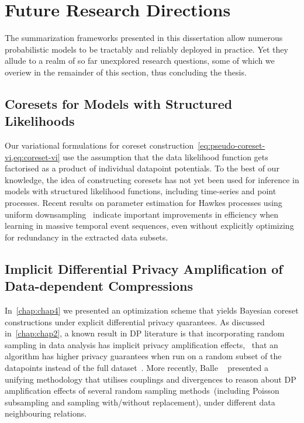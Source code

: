 \section{Future Research Directions}
\label{sec:future-research-directions}
The summarization frameworks presented in this dissertation allow numerous probabilistic models to be tractably and reliably deployed in practice. Yet they allude to a realm of so far unexplored research questions, some of which we overiew in the remainder of this section, thus concluding the thesis.

\subsection{Coresets for Models with Structured Likelihoods}
\label{subsec:structure-liks}

Our variational formulations for coreset construction~\cref{eq:pseudo-coreset-vi,eq:coreset-vi} use the assumption that the data likelihood function gets factorised as a product of individual datapoint potentials. To the best of our knowledge, the idea of constructing coresets has not yet been used for inference in models with structured likelihood functions, including time-series and point processes. Recent results on parameter estimation for Hawkes processes using uniform downsampling~\citep{li19} indicate important improvements in efficiency when learning in massive temporal event sequences, even without explicitly optimizing for redundancy in the extracted data subsets.

\subsection{Implicit Differential Privacy Amplification of Data-dependent Compressions}
\label{subsec:implicit-dp-amplification}

In~\cref{chap:chap4} we presented an optimization scheme that yields Bayesian coreset constructions under explicit differential privacy quarantees. As discussed in~\cref{chap:chap2}, a known result in DP literature is that incorporating random sampling in data analysis has implicit privacy amplification effects, \ie~that an algorithm has higher privacy guarantees when run on a random subset of the datapoints instead of the full dataset~\citep{li12, beimel13, bassily14, abadi16}. More recently, Balle \etal~\citep{balle18} presented a unifying methodology that utilises couplings and divergences to reason about DP amplification effects of several random sampling methods~(including Poisson subsampling and sampling with/without replacement), under different data neighbouring relations.

